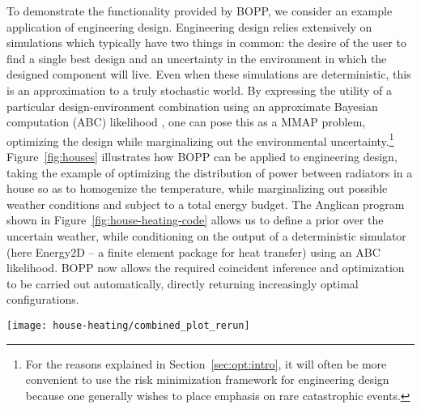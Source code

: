 
To demonstrate the functionality provided by BOPP, we consider an example application of engineering design.  Engineering design relies extensively on simulations which typically have two things in common: the desire of the user to find a single best design and an uncertainty in the environment in which the designed component will live. Even when these simulations are deterministic, this is an approximation to a truly stochastic world. By expressing the utility of a particular design-environment combination using an approximate Bayesian computation (ABC) likelihood \citep{csillery2010approximate}, one can pose this as a MMAP problem, optimizing the design while marginalizing out the environmental uncertainty.\footnote{For the reasons explained in Section~\ref{sec:opt:intro},
	it will often be more
	convenient to use the risk minimization framework for engineering design because one generally wishes to place emphasis
	on rare catastrophic events.}
Figure~\ref{fig:houses} illustrates how BOPP can be applied to engineering design, taking the example of optimizing the distribution of power between radiators in a house so as to homogenize the temperature, while marginalizing out possible weather conditions and subject to a total energy budget. The Anglican program shown in Figure~\ref{fig:house-heating-code} allows us to define a prior over the uncertain weather, while conditioning on the output of a deterministic simulator (here Energy2D \citep{xie2012energy2d} -- a finite element package for heat transfer) using an ABC likelihood.  BOPP now allows the required coincident inference and optimization to be carried out automatically, directly returning increasingly optimal configurations. 

\begin{figure*}[t]
	\texttt{[image: house-heating/combined\_plot\_rerun]}
	\caption{
		\label{fig:houses}
		Simulation-based optimization of radiator powers subject to varying solar intensity. Shown are output heat maps from Energy2D \citep{xie2012energy2d} simulations at one intensity, corresponding from left to right to setting all the radiators to the same power, the best result from a set of randomly chosen powers, and the best setup found after 100 iterations of BOPP. The far right plot shows convergence of the evidence of the respective model, giving the median and 25/75\% quartiles.
	}
\end{figure*}

